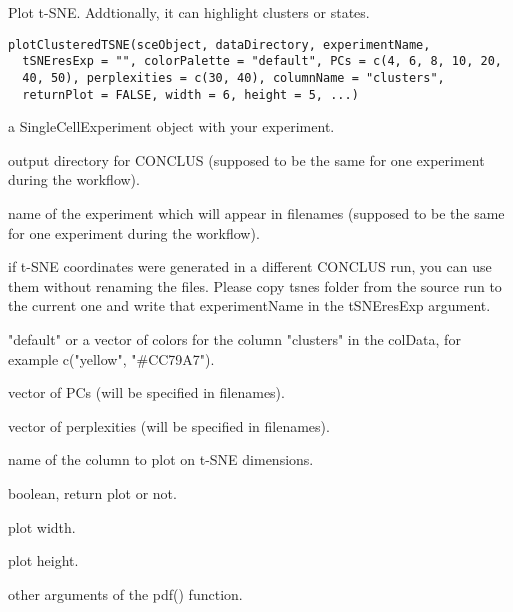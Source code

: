 \documentclass[a4paper]{book}
\begin{document}
%
\begin{Description}\relax
Plot t-SNE. Addtionally, it can highlight clusters or states.
\end{Description}
%
\begin{Usage}
\begin{verbatim}
plotClusteredTSNE(sceObject, dataDirectory, experimentName,
  tSNEresExp = "", colorPalette = "default", PCs = c(4, 6, 8, 10, 20,
  40, 50), perplexities = c(30, 40), columnName = "clusters",
  returnPlot = FALSE, width = 6, height = 5, ...)
\end{verbatim}
\end{Usage}
%
\begin{Arguments}
\begin{ldescription}
\item[\code{sceObject}] a SingleCellExperiment object with your experiment.

\item[\code{dataDirectory}] output directory for CONCLUS (supposed to be the same for one experiment during the workflow).

\item[\code{experimentName}] name of the experiment which will appear in filenames (supposed to be the same for one experiment during the workflow).

\item[\code{tSNEresExp}] if t-SNE coordinates were generated in a different CONCLUS run, you can use them without renaming the files.
Please copy tsnes folder from the source run to the current one and write that experimentName in the tSNEresExp argument.

\item[\code{colorPalette}] "default" or a vector of colors for the column "clusters" in the colData, for example c("yellow", "\#CC79A7").

\item[\code{PCs}] vector of PCs (will be specified in filenames).

\item[\code{perplexities}] vector of perplexities (will be specified in filenames).

\item[\code{columnName}] name of the column to plot on t-SNE dimensions.

\item[\code{returnPlot}] boolean, return plot or not.

\item[\code{width}] plot width.

\item[\code{height}] plot height.

\item[\code{...}] other arguments of the pdf() function.
\end{ldescription}
\end{Arguments}
\end{document}

